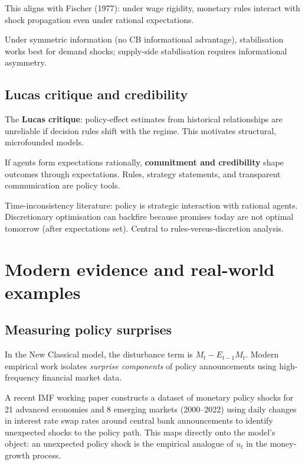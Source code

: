 \documentclass[
  letterpaper,
  DIV=11,
  numbers=noendperiod]{scrartcl}
\begin{document}
This aligns with Fischer (1977): under wage rigidity, monetary rules
interact with shock propagation even under rational expectations.

Under symmetric information (no CB informational advantage),
stabilisation works best for demand shocks; supply-side stabilisation
requires informational asymmetry.

\subsection{Lucas critique and
credibility}\label{lucas-critique-and-credibility-1}

The \textbf{Lucas critique}: policy-effect estimates from historical
relationships are unreliable if decision rules shift with the regime.
This motivates structural, microfounded models.

If agents form expectations rationally, \textbf{commitment and
credibility} shape outcomes through expectations. Rules, strategy
statements, and transparent communication are policy tools.

Time-inconsistency literature: policy is strategic interaction with
rational agents. Discretionary optimisation can backfire because
promises today are not optimal tomorrow (after expectations set).
Central to rules-versus-discretion analysis.

\section{Modern evidence and real-world
examples}\label{modern-evidence-and-real-world-examples}

\subsection{Measuring policy
surprises}\label{measuring-policy-surprises-1}

In the New Classical model, the disturbance term is
\(M_t - E_{t-1}M_t\). Modern empirical work isolates \emph{surprise
components} of policy announcements using high-frequency financial
market data.

A recent IMF working paper constructs a dataset of monetary policy
shocks for 21 advanced economies and 8 emerging markets (2000--2022)
using daily changes in interest rate swap rates around central bank
announcements to identify unexpected shocks to the policy path. This
maps directly onto the model's object: an unexpected policy shock is the
empirical analogue of \(u_t\) in the money-growth process.
\end{document}

